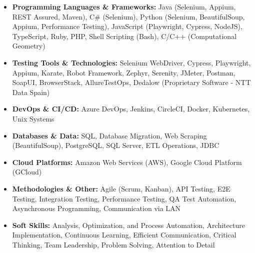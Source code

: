 \begin{itemize}[leftmargin=*, label={}, itemsep=0.05in]

    \item \textbf{Programming Languages \& Frameworks:} Java (Selenium, Appium, REST Assured, Maven), C\# (Selenium), Python (Selenium, BeautifulSoup, Appium, Performance Testing), JavaScript (Playwright, Cypress, NodeJS), TypeScript, Ruby, PHP, Shell Scripting (Bash), C/C++ (Computational Geometry)
    \vspace{0.05in} %

    \item \textbf{Testing Tools \& Technologies:} Selenium WebDriver, Cypress, Playwright, Appium, Karate, Robot Framework, Zephyr, Serenity, JMeter, Postman, SoapUI, BrowserStack, AllureTestOps, Dedalow (Proprietary Software - NTT Data Spain)
    \vspace{0.05in}

    \item \textbf{DevOps \& CI/CD:} Azure DevOps, Jenkins, CircleCI, Docker, Kubernetes, Unix Systems
    \vspace{0.05in}

    \item \textbf{Databases \& Data:} SQL, Database Migration, Web Scraping (BeautifulSoup), PostgreSQL, SQL Server, ETL Operations, JDBC
    \vspace{0.05in}

    \item \textbf{Cloud Platforms:} Amazon Web Services (AWS), Google Cloud Platform (GCloud)
    \vspace{0.05in}

    \item \textbf{Methodologies \& Other:} Agile (Scrum, Kanban), API Testing, E2E Testing, Integration Testing, Performance Testing, QA Test Automation, Asynchronous Programming, Communication via LAN
    \vspace{0.05in}

    \item \textbf{Soft Skills:} Analysis, Optimization, and Process Automation, Architecture Implementation, Continuous Learning, Efficient Communication, Critical Thinking, Team Leadership, Problem Solving, Attention to Detail

\end{itemize}
